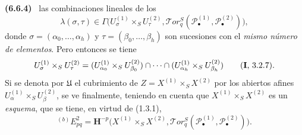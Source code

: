 \documentclass[10pt,oneside]{book}
\newenvironment{env}[1][]{\par\medskip\noindent\textbf{(#1)}\ }{\par}
\begin{document}
\begin{env}[6.6.4]
las combinaciones lineales de los
\[
  \lambda(\sigma,\tau)\in
  \Gamma\bigl(U_\sigma^{(1)}\times_S U_\tau^{(2)},
    \mathscr{T}\!or_q^S
    (\mathscr P_\bullet^{(1)},\mathscr P_\bullet^{(2)})\bigr),
\]
donde $\sigma=(\alpha_0,\ldots,\alpha_h)$ y
$\tau=(\beta_0,\ldots,\beta_h)$ son sucesiones con el \emph{mismo número de
elementos}. Pero entonces se tiene
\[
  U_\sigma^{(1)}\times_S U_\tau^{(2)}
  =(U_{\alpha_0}^{(1)}\times_S U_{\beta_0}^{(2)})\cap\cdots\cap
    (U_{\alpha_h}^{(1)}\times_S U_{\beta_h}^{(2)})
  \qquad\text{(\textbf I, 3.2.7)}.
\]
Si se denota por $\mathfrak U$ el cubrimiento de
$Z=X^{(1)}\times_S X^{(2)}$ por los abiertos afines
$U_\alpha^{(1)}\times_S U_\beta^{(2)}$, se ve finalmente, teniendo en cuenta
que $X^{(1)}\times_S X^{(2)}$ es un \emph{esquema}, que se tiene, en virtud de
(1.3.1),
\[
  {}^{(b)}E_{pq}^2
  =\mathbf H^{-p}\bigl(X^{(1)}\times_S X^{(2)},
    \mathscr{T}\!or_q^S
    (\mathscr P_\bullet^{(1)},\mathscr P_\bullet^{(2)})\bigr).
\]


\end{env}
\end{document}
